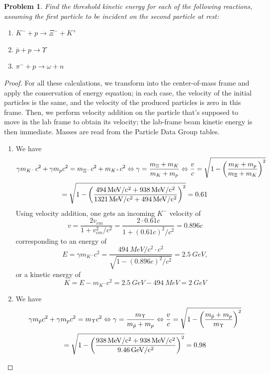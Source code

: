 \documentclass{article}
\newtheorem{plm}{Problem}
\begin{document}
\begin{plm}
  Find the threshold kinetic energy for each of the following reactions, assuming the first particle to be incident on the second particle
  at rest:
  \begin{enumerate}
  \item $K^{-} + p \to \Xi^{-} + K^{+}$
  \item $\bar{p} + p \to \Upsilon$
  \item $\pi^{-} + p \to \omega + n$
  \end{enumerate}
\end{plm}

\begin{proof}
  For all these calculations, we transform into the center-of-mass frame and apply the conservation of energy equation;
  in each case, the velocity of the initial particles is the same, and the velocity of the produced particles is zero in this frame.
  Then, we perform velocity addition on the particle that's supposed to move in the lab frame to obtain its velocity;
  the lab-frame beam kinetic energy is then immediate.
  Masses are read from the Particle Data Group tables.
  \begin{enumerate}
  \item We have
    \[
      \gamma m_{K^{-}}c^{2} + \gamma m_{p}c^{2} = m_{\Xi^{-}}c^{2} + m_{K^{+}}c^{2}
      \Leftrightarrow \gamma = \frac{m_{\Xi} + m_{K}}{m_{K} + m_{p}}
      \Leftrightarrow \frac{v}{c} = \sqrt{1 - \qty(\frac{m_{K} + m_{p}}{m_{\Xi} + m_{K}})^{2}}
    \]
    \[
      = \sqrt{1 - \qty(\frac{\SI{494}{MeV/c^{2}} + \SI{938}{MeV/c^{2}}}{\SI{1321}{MeV/c^{2}} + \SI{494}{MeV/c^{2}}})^{2}}
      = 0.61
    \]
    Using velocity addition, one gets an incoming $K^{-}$ velocity of
    \[
      v = \frac{2v_{cm}}{1 + v_{cm}^{2}/c^{2}} = \frac{2 \cdot 0.61c}{1 + (0.61c)^{2}/c^{2}} = 0.896c
    \]
    corresponding to an energy of
    \[
      E = \gamma m_{K^{-}}c^{2} = \frac{\SI{494}{MeV/c^{2}} \cdot c^{2}}{\sqrt{1 - (0.896c)^{2}/c^{2}}}
      = \SI{2.5}{GeV},
    \]
    or a kinetic energy of
    \[
      K = E - m_{K^{-}}c^{2} = \SI{2.5}{GeV} - \SI{494}{MeV} = \SI{2}{GeV}
    \]
  \item We have
    \[
      \gamma m_{\bar{p}}c^{2} + \gamma m_{p}c^{2} = m_{\Upsilon}c^{2}
      \Leftrightarrow \gamma = \frac{m_{\Upsilon}}{m_{\bar{p}} + m_{p}}
      \Leftrightarrow \frac{v}{c} = \sqrt{1 - \qty(\frac{m_{\bar{p}} + m_{p}}{m_{\Upsilon}})^{2}}
    \]
    \[
      = \sqrt{1 - \qty(\frac{\SI{938}{MeV/c^{2}} + \SI{938}{MeV/c^{2}}}{\SI{9.46}{GeV/c^{2}}})^{2}}
      = 0.98
\]
\end{enumerate}
\end{proof}
\end{document}
